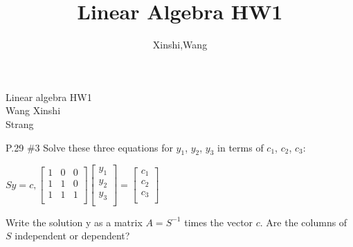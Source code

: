 \documentclass{article}
\title{Linear Algebra HW1}
\author{Xinshi,Wang}
\begin{document}
	\noindent
	Linear algebra HW1\\
	Wang Xinshi\\
	
	\noindent Strang\\
	\begin{addmargin}[3em]{3em}
		P.29 \#3 Solve these three equations for $y_{1}$, $y_{2}$, $y_{3}$ in terms of $c_{1}$, $c_{2}$, $c_{3}$:\\ 
		\begin{addmargin}[10em]{5em}
				 $Sy = c, 
				 \begin{bmatrix}
				 	1 & 0 & 0\\
				 	1 & 1 & 0\\
				 	1 & 1 & 1\\
				 \end{bmatrix}
			 	\begin{bmatrix}
			 		y_1\\ 
			 		y_2\\
			 		y_3\\
			 	\end{bmatrix}
		 			=
				\begin{bmatrix}
					c_1\\ 
					c_2\\
					c_3\\
				\end{bmatrix}$\\
		\end{addmargin}
		\begin{addmargin}[2em]{0em}
				Write the solution y as a matrix $A = S^{-1}$ times the vector $c$. Are the columns of $S$ independent or dependent?\\
		\end{addmargin}
	
	\end{addmargin}
\end{document}

